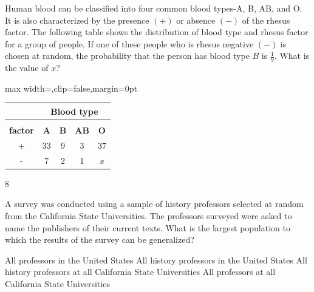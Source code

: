 \question[1]
Human blood can be classified into four common blood types-A, B, AB, and O. It is also characterized by the presence $(+)$ or absence $(-)$ of the rhesus factor. The following table shows the distribution of blood type and rhesus factor for a group of people. If one of these people who is rhesus negative $(-)$ is chosen at random, the probability that the person has blood type $B$ is $\frac{1}{9}$. What is the value of $x$?
\begin{center}
  \renewcommand{\arraystretch}{1.3}
  \setlength{\tabcolsep}{0.5em}
  \label{tab:sat-drill-07-blood-rhesus}%
  \vspace{0.35em}
  \begin{adjustbox}{max width=\linewidth,clip=false,margin=0pt}
  \begin{tabular}{|c|c|c|c|c|}
    \hline
    \cellcolor[HTML]{E0E0E0}\mbox{} &
    \multicolumn{4}{|c|}{\cellcolor[HTML]{E0E0E0}\textbf{Blood type}} \\
    \hline
    \cellcolor[HTML]{E0E0E0}\makecell{\textbf{Rhesus}\\\textbf{factor}} &
    \cellcolor[HTML]{E0E0E0}\textbf{A} &
    \cellcolor[HTML]{E0E0E0}\textbf{B} &
    \cellcolor[HTML]{E0E0E0}\textbf{AB} &
    \cellcolor[HTML]{E0E0E0}\textbf{O} \\
    \hline
    + & 33 & 9 & 3 & 37 \\
    \hline
    - & 7 & 2 & 1 & $x$ \\
    \hline
  \end{tabular}
  \end{adjustbox}
\end{center}
\begin{solution}
8
\end{solution}

\newpage


\question[1]
A survey was conducted using a sample of history professors selected at random from the California State Universities. The professors surveyed were asked to name the publishers of their current texts. What is the largest population to which the results of the survey can be generalized?
\begin{choices}
  \choice All professors in the United States
  \choice All history professors in the United States
  \CorrectChoice All history professors at all California State Universities
  \choice All professors at all California State Universities
\end{choices}

